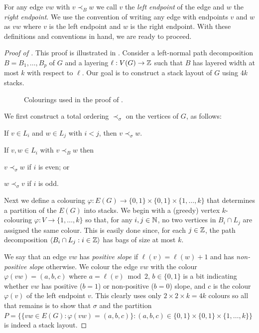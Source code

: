 \documentclass{patmorin}
\begin{document}
For any edge $vw$ with $v\prec_B w$ we call $v$ the \emph{left endpoint} of the edge and $w$ the \emph{right endpoint}.  We use the convention of writing any edge with endpoints $v$ and $w$ as $vw$ where $v$ is the left endpoint and $w$ is the right endpoint.  With these definitions and conventions in hand, we are ready to proceed.

\begin{proof}[Proof of ]
  This proof is illustrated in .
  Consider a left-normal path decomposition $B=B_1,\ldots,B_p$ of $G$ and a layering $\ell:V(G)\to\mathbb{Z}$ such that $B$ has layered width at most $k$ with respect to $\ell$.  Our goal is to construct a stack layout of $G$ using $4k$ stacks.
  \begin{figure}
      \caption{Colourings used in the proof of .}
  \end{figure}

  We first construct a total ordering $\prec_\sigma$ on the vertices of $G$, as follows:
  \begin{compactenum}[(Property 1)]
    \item If $v\in L_i$ and $w\in L_j$ with $i < j$, then $v\prec_\sigma w$.
    \item If $v,w\in L_i$ with $v \prec_B w$ then
    \begin{compactenum}[(a)]
      \item $v\prec_\sigma w$ if $i$ is even; or
      \item $w\prec_\sigma v$ if $i$ is odd.
    \end{compactenum}
  \end{compactenum}

  Next we define a colouring $\varphi:E(G)\to\{0,1\}\times\{0,1\}\times\{1,\ldots,k\}$ that determines a partition of the $E(G)$ into stacks.  We begin with a (greedy) vertex $k$-colouring $\varphi:V\to \lbrace 1,\ldots,k\rbrace$ so that, for any $i,j\in\mathbb{N}$, no two vertices in $B_i\cap L_j$ are assigned the same colour. This is easily done since, for each $j\in\mathbb{Z}$, the path decomposition $\langle B_i\cap L_j : i\in \mathbb{Z}\rangle$ has bags of size at most $k$.

  We say that an edge $vw$ has \emph{positive slope} if $\ell(v)=\ell(w)+1$ and has \emph{non-positive slope} otherwise.  We colour the edge $vw$ with the colour $\varphi(vw)=(a,b,c)$ where $a=\ell(v)\bmod 2$, $b\in\{0,1\}$ is a bit indicating whether $vw$ has positive ($b=1$) or non-positive ($b=0$) slope, and $c$ is the colour $\varphi(v)$ of the left endpoint $v$.  This clearly uses only $2\times2\times k=4k$ colours so all that remains is to show that
  $\sigma$ and the partition $P=\{\{vw\in E(G):\varphi(vw)=(a,b,c)\}:(a,b,c)\in \{0,1\}\times\{0,1\}\times\{1,\ldots,k\}\}$  is indeed a stack layout.


\end{proof}
\end{document}
